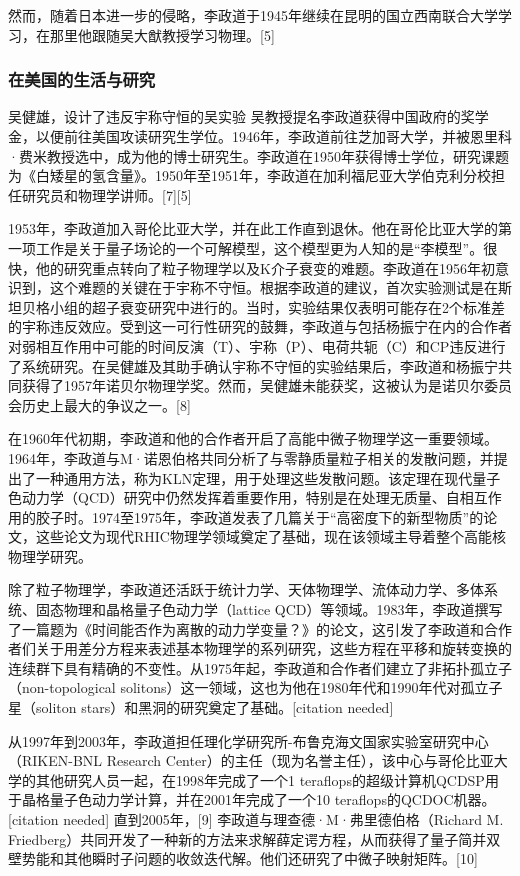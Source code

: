 然而，随着日本进一步的侵略，李政道于1945年继续在昆明的国立西南联合大学学习，在那里他跟随吴大猷教授学习物理。[5]
\subsubsection{在美国的生活与研究}  
吴健雄，设计了违反宇称守恒的吴实验  
吴教授提名李政道获得中国政府的奖学金，以便前往美国攻读研究生学位。1946年，李政道前往芝加哥大学，并被恩里科·费米教授选中，成为他的博士研究生。李政道在1950年获得博士学位，研究课题为《白矮星的氢含量》。1950年至1951年，李政道在加利福尼亚大学伯克利分校担任研究员和物理学讲师。[7][5]

1953年，李政道加入哥伦比亚大学，并在此工作直到退休。他在哥伦比亚大学的第一项工作是关于量子场论的一个可解模型，这个模型更为人知的是“李模型”。很快，他的研究重点转向了粒子物理学以及K介子衰变的难题。李政道在1956年初意识到，这个难题的关键在于宇称不守恒。根据李政道的建议，首次实验测试是在斯坦贝格小组的超子衰变研究中进行的。当时，实验结果仅表明可能存在2个标准差的宇称违反效应。受到这一可行性研究的鼓舞，李政道与包括杨振宁在内的合作者对弱相互作用中可能的时间反演（T）、宇称（P）、电荷共轭（C）和CP违反进行了系统研究。在吴健雄及其助手确认宇称不守恒的实验结果后，李政道和杨振宁共同获得了1957年诺贝尔物理学奖。然而，吴健雄未能获奖，这被认为是诺贝尔委员会历史上最大的争议之一。[8]

在1960年代初期，李政道和他的合作者开启了高能中微子物理学这一重要领域。1964年，李政道与M·诺恩伯格共同分析了与零静质量粒子相关的发散问题，并提出了一种通用方法，称为KLN定理，用于处理这些发散问题。该定理在现代量子色动力学（QCD）研究中仍然发挥着重要作用，特别是在处理无质量、自相互作用的胶子时。1974至1975年，李政道发表了几篇关于“高密度下的新型物质”的论文，这些论文为现代RHIC物理学领域奠定了基础，现在该领域主导着整个高能核物理学研究。

除了粒子物理学，李政道还活跃于统计力学、天体物理学、流体动力学、多体系统、固态物理和晶格量子色动力学（lattice QCD）等领域。1983年，李政道撰写了一篇题为《时间能否作为离散的动力学变量？》的论文，这引发了李政道和合作者们关于用差分方程来表述基本物理学的系列研究，这些方程在平移和旋转变换的连续群下具有精确的不变性。从1975年起，李政道和合作者们建立了非拓扑孤立子（non-topological solitons）这一领域，这也为他在1980年代和1990年代对孤立子星（soliton stars）和黑洞的研究奠定了基础。[citation needed]

从1997年到2003年，李政道担任理化学研究所-布鲁克海文国家实验室研究中心（RIKEN-BNL Research Center）的主任（现为名誉主任），该中心与哥伦比亚大学的其他研究人员一起，在1998年完成了一个1 teraflops的超级计算机QCDSP用于晶格量子色动力学计算，并在2001年完成了一个10 teraflops的QCDOC机器。[citation needed] 直到2005年，[9] 李政道与理查德·M·弗里德伯格（Richard M. Friedberg）共同开发了一种新的方法来求解薛定谔方程，从而获得了量子简并双壁势能和其他瞬时子问题的收敛迭代解。他们还研究了中微子映射矩阵。[10]

